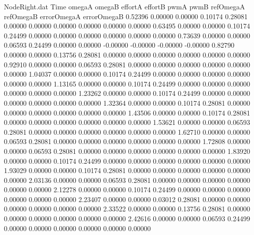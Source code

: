 \begin{filecontents}{NodeRight.dat}
Time omegaA omegaB effortA effortB pwmA pwmB refOmegaA refOmegaB errorOmegaA errorOmegaB
   0.52396    0.00000    0.00000     0.10174    0.28081    0.00000    0.00000    0.00000    0.00000    0.00000    0.00000
   0.63495    0.00000    0.00000     0.10174    0.24499    0.00000    0.00000    0.00000    0.00000    0.00000    0.00000
   0.73639    0.00000    0.00000     0.06593    0.24499    0.00000    0.00000   -0.00000   -0.00000   -0.00000   -0.00000
   0.82790    0.00000    0.00000     0.13756    0.28081    0.00000    0.00000    0.00000    0.00000    0.00000    0.00000
   0.92910    0.00000    0.00000     0.06593    0.28081    0.00000    0.00000    0.00000    0.00000    0.00000    0.00000
   1.04037    0.00000    0.00000     0.10174    0.24499    0.00000    0.00000    0.00000    0.00000    0.00000    0.00000
   1.13165    0.00000    0.00000     0.10174    0.24499    0.00000    0.00000    0.00000    0.00000    0.00000    0.00000
   1.23262    0.00000    0.00000     0.10174    0.24499    0.00000    0.00000    0.00000    0.00000    0.00000    0.00000
   1.32364    0.00000    0.00000     0.10174    0.28081    0.00000    0.00000    0.00000    0.00000    0.00000    0.00000
   1.43506    0.00000    0.00000     0.10174    0.28081    0.00000    0.00000    0.00000    0.00000    0.00000    0.00000
   1.53621    0.00000    0.00000     0.06593    0.28081    0.00000    0.00000    0.00000    0.00000    0.00000    0.00000
   1.62710    0.00000    0.00000     0.06593    0.28081    0.00000    0.00000    0.00000    0.00000    0.00000    0.00000
   1.72808    0.00000    0.00000     0.06593    0.28081    0.00000    0.00000    0.00000    0.00000    0.00000    0.00000
   1.83920    0.00000    0.00000     0.10174    0.24499    0.00000    0.00000    0.00000    0.00000    0.00000    0.00000
   1.93029    0.00000    0.00000     0.10174    0.28081    0.00000    0.00000    0.00000    0.00000    0.00000    0.00000
   2.03136    0.00000    0.00000     0.06593    0.28081    0.00000    0.00000    0.00000    0.00000    0.00000    0.00000
   2.12278    0.00000    0.00000     0.10174    0.24499    0.00000    0.00000    0.00000    0.00000    0.00000    0.00000
   2.23407    0.00000    0.00000     0.03012    0.28081    0.00000    0.00000    0.00000    0.00000    0.00000    0.00000
   2.33522    0.00000    0.00000     0.13756    0.28081    0.00000    0.00000    0.00000    0.00000    0.00000    0.00000
   2.42616    0.00000    0.00000     0.06593    0.24499    0.00000    0.00000    0.00000    0.00000    0.00000    0.00000

\end{filecontents}
